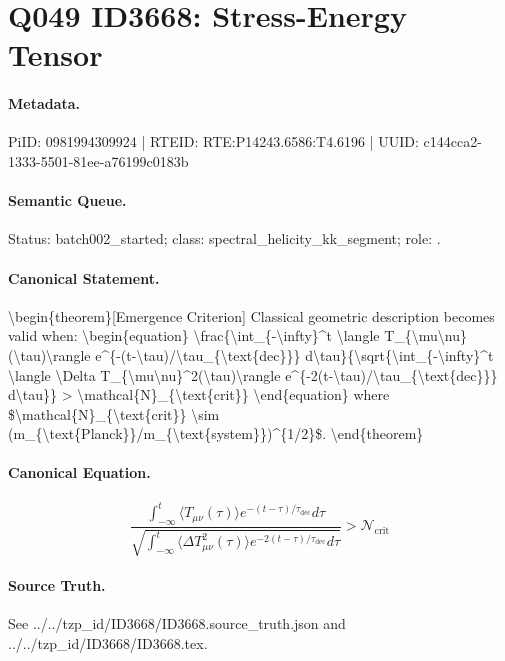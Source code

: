 \section*{Q049 ID3668: Stress-Energy Tensor}
\paragraph{Metadata.}
PiID: 0981994309924 | RTEID: RTE:P14243.6586:T4.6196 | UUID: c144cca2-1333-5501-81ee-a76199c0183b

\paragraph{Semantic Queue.}
Status: batch002\_started; class: spectral\_helicity\_kk\_segment; role: .

\paragraph{Canonical Statement.}
\textbackslash{}begin\{theorem\}[Emergence Criterion] Classical geometric description becomes valid when: \textbackslash{}begin\{equation\} \textbackslash{}frac\{\textbackslash{}int\_\{-\textbackslash{}infty\}\textasciicircum{}t \textbackslash{}langle T\_\{\textbackslash{}mu\textbackslash{}nu\}(\textbackslash{}tau)\textbackslash{}rangle e\textasciicircum{}\{-(t-\textbackslash{}tau)/\textbackslash{}tau\_\{\textbackslash{}text\{dec\}\}\} d\textbackslash{}tau\}\{\textbackslash{}sqrt\{\textbackslash{}int\_\{-\textbackslash{}infty\}\textasciicircum{}t \textbackslash{}langle \textbackslash{}Delta T\_\{\textbackslash{}mu\textbackslash{}nu\}\textasciicircum{}2(\textbackslash{}tau)\textbackslash{}rangle e\textasciicircum{}\{-2(t-\textbackslash{}tau)/\textbackslash{}tau\_\{\textbackslash{}text\{dec\}\}\} d\textbackslash{}tau\}\} > \textbackslash{}mathcal\{N\}\_\{\textbackslash{}text\{crit\}\} \textbackslash{}end\{equation\} where \$\textbackslash{}mathcal\{N\}\_\{\textbackslash{}text\{crit\}\} \textbackslash{}sim (m\_\{\textbackslash{}text\{Planck\}\}/m\_\{\textbackslash{}text\{system\}\})\textasciicircum{}\{1/2\}\$. \textbackslash{}end\{theorem\}

\paragraph{Canonical Equation.}
\[
\begin{equation} \frac{\int_{-\infty}^t \langle T_{\mu\nu}(\tau)\rangle e^{-(t-\tau)/\tau_{\text{dec}}} d\tau}{\sqrt{\int_{-\infty}^t \langle \Delta T_{\mu\nu}^2(\tau)\rangle e^{-2(t-\tau)/\tau_{\text{dec}}} d\tau}} > \mathcal{N}_{\text{crit}} \end{equation}
\]

\paragraph{Source Truth.}
See ../../tzp\_id/ID3668/ID3668.source\_truth.json and ../../tzp\_id/ID3668/ID3668.tex.
